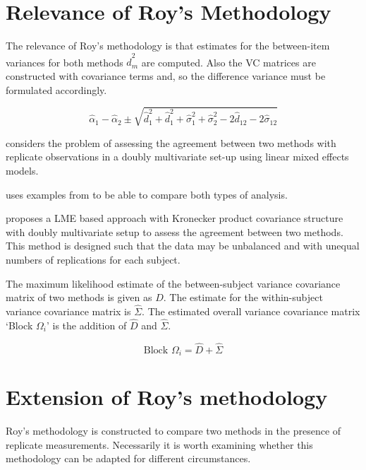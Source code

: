 \documentclass[12pt, a4paper]{report}
\theoremstyle{plain}
\theoremstyle{definition}
\theoremstyle{remark}
\begin{document}
\section{Relevance of Roy's Methodology}

The relevance of Roy's methodology is that estimates for the between-item variances for both methods $\hat{d}^2_m$ are computed. Also the VC matrices are constructed with covariance
terms and, so the difference variance must be formulated accordingly.


\[
\hat{\alpha}_1 - \hat{\alpha}_2 \pm \sqrt{ \hat{d}^2_1  +
	\hat{d}^2_1 + \hat{\sigma}^2_1 + \hat{\sigma}^2_2 - 2 \hat{d}_{12}
	- 2 \hat{\sigma}_12}
\]




\citet{ARoy2009} considers the problem of assessing the agreement
between two methods with replicate observations in a doubly
multivariate set-up using linear mixed effects models.

\citet{ARoy2009} uses examples from \citet{BA86} to be able to
compare both types of analysis.

\citet{ARoy2009} proposes a LME based approach with Kronecker
product covariance structure with doubly multivariate setup to
assess the agreement between two methods. This method is designed
such that the data may be unbalanced and with unequal numbers of
replications for each subject.

The maximum likelihood estimate of the between-subject variance
covariance matrix of two methods is given as $D$. The estimate for
the within-subject variance covariance matrix is $\hat{\Sigma}$.
The estimated overall variance covariance matrix `Block
$\Omega_{i}$' is the addition of $\hat{D}$ and $\hat{\Sigma}$.


\begin{equation}
	\mbox{Block  }\Omega_{i} = \hat{D} + \hat{\Sigma}
\end{equation}



\newpage


\section{Extension of Roy's methodology}
Roy's methodology is constructed to compare two methods in the presence of replicate measurements. Necessarily it is worth examining whether this methodology can be adapted for different circumstances.
\end{document}
